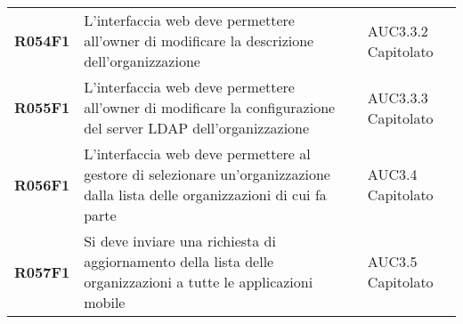 \documentclass[../analisi-dei-requisiti.tex]{subfiles}
\begin{document}
\begin{center}
\begin{longtable}[H]{>{\centering\bfseries}m{3cm} >{\centering}m{10cm} >{\centering\arraybackslash}m{3cm}}
  R054F1                               & L'interfaccia web deve permettere all'owner di modificare la descrizione dell'organizzazione                                                                                                            & AUC3.3.2 Capitolato           \\
  R055F1                               & L'interfaccia web deve permettere all'owner di modificare la configurazione del server LDAP dell'organizzazione                                                                                         & AUC3.3.3 Capitolato           \\
  R056F1                               & L'interfaccia web deve permettere al gestore di selezionare un'organizzazione dalla lista delle organizzazioni di cui fa parte                                                                          & AUC3.4 Capitolato             \\
  R057F1                               & Si deve inviare una richiesta di aggiornamento della lista delle organizzazioni a tutte le applicazioni mobile                                                                                          & AUC3.5 Capitolato             \\


\end{longtable}
\end{center}
\end{document}
